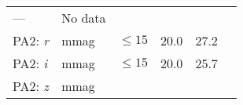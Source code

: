\documentclass[DM,lsstdraft,toc]{lsstdoc}
\begin{document}
\begin{longtable}[]{@{}llllll@{}}
\begin{minipage}[t]{0.12\columnwidth}
---\strut
\end{minipage} & \begin{minipage}[t]{0.17\columnwidth}\raggedright\strut
No data\strut
\end{minipage}\tabularnewline
\begin{minipage}[t]{0.14\columnwidth}\raggedright\strut
PA2: \emph{r}\strut
\end{minipage} & \begin{minipage}[t]{0.06\columnwidth}\raggedright\strut
mmag\strut
\end{minipage} & \begin{minipage}[t]{0.17\columnwidth}\raggedright\strut
\(\leq 15\)\strut
\end{minipage} & \begin{minipage}[t]{0.17\columnwidth}\raggedright\strut
20.0\strut
\end{minipage} & \begin{minipage}[t]{0.12\columnwidth}\raggedright\strut
27.2\strut
\end{minipage} & \begin{minipage}[t]{0.17\columnwidth}\raggedright\strut
\strut
\end{minipage}\tabularnewline
\begin{minipage}[t]{0.14\columnwidth}\raggedright\strut
PA2: \emph{i}\strut
\end{minipage} & \begin{minipage}[t]{0.06\columnwidth}\raggedright\strut
mmag\strut
\end{minipage} & \begin{minipage}[t]{0.17\columnwidth}\raggedright\strut
\(\leq 15\)\strut
\end{minipage} & \begin{minipage}[t]{0.17\columnwidth}\raggedright\strut
20.0\strut
\end{minipage} & \begin{minipage}[t]{0.12\columnwidth}\raggedright\strut
25.7\strut
\end{minipage} & \begin{minipage}[t]{0.17\columnwidth}\raggedright\strut
\strut
\end{minipage}\tabularnewline
\begin{minipage}[t]{0.14\columnwidth}\raggedright\strut
PA2: \emph{z}\strut
\end{minipage} & \begin{minipage}[t]{0.06\columnwidth}\raggedright\strut
mmag\strut
\end{minipage} & \begin{minipage}[t]{0.17\columnwidth}\raggedright\strut

\end{minipage}
\end{longtable}
\end{document}
